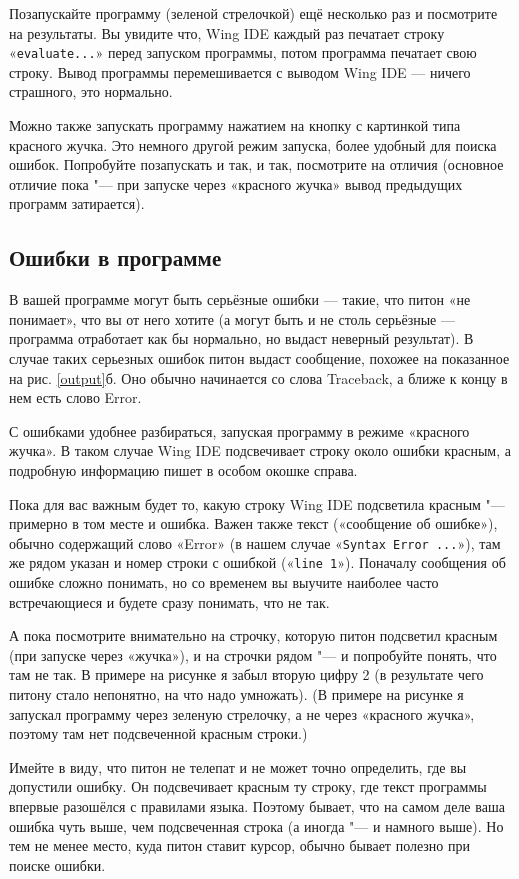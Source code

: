 Позапускайте программу (зеленой стрелочкой) ещё несколько раз и посмотрите на результаты. Вы увидите что, 
Wing IDE каждый раз печатает строку «\verb`evaluate...`» перед запуском программы, 
потом программа печатает свою строку.
Вывод программы перемешивается с выводом Wing IDE — ничего страшного, это нормально.

Можно также запускать программу нажатием на кнопку с картинкой типа красного жучка. 
Это немного другой режим запуска, более удобный для поиска ошибок. Попробуйте позапускать и так, и так, 
посмотрите на отличия (основное отличие пока "--- при запуске через «красного жучка» вывод предыдущих программ затирается).

\subsection{Ошибки в программе}
\label{sec:ce}
В вашей программе могут быть серьёзные ошибки — такие, что питон «не понимает», что вы от него хотите 
(а могут быть и не столь серьёзные — программа отработает как бы нормально, но выдаст неверный результат). 
В случае таких серьезных ошибок питон выдаст сообщение, похожее на показанное на рис. \ref{output}б.
Оно обычно начинается со слова Traceback, а ближе к концу в нем есть слово Error.

С ошибками удобнее разбираться, запуская программу в режиме «красного жучка». В таком случае Wing IDE 
подсвечивает строку около ошибки красным, а подробную информацию пишет в особом окошке справа.

Пока для вас важным будет то, какую строку Wing IDE подсветила красным "--- примерно в том месте и ошибка. Важен также
текст («сообщение об ошибке»), обычно содержащий слово «Error» (в нашем случае «\verb`Syntax Error ...`»),
там же рядом указан и номер строки с ошибкой («\verb`line 1`»).
Поначалу сообщения об ошибке сложно понимать, но со временем вы выучите наиболее часто встречающиеся 
и будете сразу понимать, что не так.

А пока посмотрите внимательно на строчку, которую питон подсветил красным (при запуске через «жучка»), 
и на строчки рядом "--- и попробуйте 
понять, что там не так. В примере на рисунке я забыл вторую цифру 2 (в результате чего питону стало непонятно,
на что надо умножать). (В примере на рисунке я запускал программу через зеленую стрелочку, а не через «красного
жучка», поэтому там нет подсвеченной красным строки.)

Имейте в виду, что питон не телепат и не может точно определить, где вы допустили ошибку. 
Он подсвечивает красным ту строку, где текст программы впервые разошёлся с правилами языка. 
Поэтому бывает, что на самом деле ваша ошибка чуть выше, чем подсвеченная строка (а иногда "--- и намного выше). 
Но тем не менее место, куда питон ставит курсор, обычно бывает полезно при поиске ошибки.

